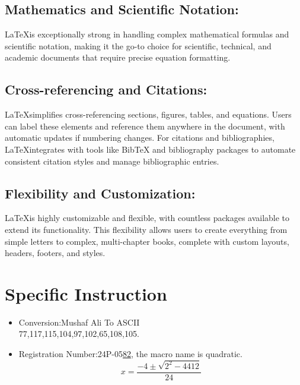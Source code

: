 \documentclass[12pt,a4paper]{article}
\begin{document}
	\subsection*{\textbf{Mathematics and Scientific Notation:}}
	\LaTeX\space is exceptionally strong in handling complex mathematical formulas and scientific notation, making it the go-to choice for scientific, technical, and academic documents that require precise equation formatting.
	\subsection*{\textbf{Cross-referencing and Citations:}}
	\LaTeX\space simplifies cross-referencing sections, figures, tables, and equations. Users can label these elements and reference them anywhere in the document, with automatic updates if numbering changes. For citations and bibliographies, \LaTeX\space integrates with tools like BibTeX and bibliography packages to automate consistent citation styles and manage bibliographic entries.
	\subsection*{\textbf{Flexibility and Customization: }}
	\LaTeX\space is highly customizable and flexible, with countless packages available to extend its functionality. This flexibility allows users to create everything from simple letters to complex, multi-chapter books, complete with custom layouts, headers, footers, and styles.
	
	
	\section{Specific Instruction} 
	\begin{itemize}
		\item Conversion:Mushaf Ali To ASCII
		\newcommand{\M}[1]{65}
		\\  77,117,115,104,97,102,65,108,105.
	\end{itemize}
	\begin{itemize}
		\item Registration Number:24P-05\underline{82}, the macro name is quadratic.
		\newcommand{\quadratic}[3]{{\frac{-#1\pm\sqrt{#2^2-4#1#3}}{2#1}}}
		\[x=\quadratic{4}{2}{12}\]
	\end{itemize}
\end{document}
